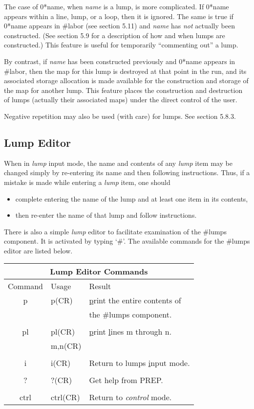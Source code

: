 The case of 0*name, when {\em name} is a lump, is more complicated. If
0*name appears within a line, lump, or a loop, then it is ignored. The same
is true if 0*name appears in \#labor (see section 5.11) and {\em name} has
{\em not} actually been constructed. (See section 5.9 for a description of
how and when lumps are constructed.) This feature is useful for temporarily
``commenting out'' a lump.

By contrast, if {\em name} has been constructed previously and 0*name
appears in \#labor, then the map for this lump is destroyed at that point
in the \Mary run, and its associated storage allocation is made available
for the construction and storage of the map for another lump. This \Mary
feature places the construction and destruction of lumps (actually their
associated maps) under the direct control of the user.

Negative repetition may also be used (with care) for lumps. See section
5.8.3.

\subsection{Lump Editor} When in {\em lump} input mode, the name and
contents of any {\em lump} item may be changed simply by re-entering its
name and then following instructions. Thus, if a mistake is made while
entering a {\em lump} item, one should
\begin{itemize} \item complete entering the name of the lump and at least
one item in its contents, \item then re-enter the name of that lump and
follow instructions.
\end{itemize}

There is also a simple {\em lump} editor to facilitate examination of the
\#lumps component. It is activated by typing `\#'. The available commands
for the \#lumps editor are listed below.
\begin{table}
\begin{center}
\begin{tabular}{|c|l|l|}\hline
\multicolumn{3}{|c|}{Lump Editor Commands}\\ \hline Command & Usage &
Result\\ \hline p & p(CR) & {\underline p}rint the entire contents of\\ & &
the \#lumps component.\\ & &\\ pl & pl(CR) & {\underline p}rint {\underline
l}ines m through n.\\ & m,n(CR) &\\ & &\\ i & i(CR) & Return to lumps
{\underline i}nput mode.\\ & &\\ ? & ?(CR) & Get help from PREP.\\ & &\\
ctrl & ctrl(CR) & Return to {\em control} mode.\\ \hline
\end{tabular}
\end{center}
\end{table}


